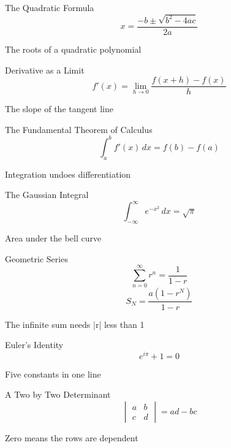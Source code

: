 \documentclass[aspectratio=169]{beamer}
\begin{document}
\begin{frame}{The Quadratic Formula}
\centering
\label{eq000}{\Huge \[ x = \frac{-b \pm \sqrt{b^2 - 4ac}}{2a} \]}
\vspace{0.6em}

{\small The roots of a quadratic polynomial}
\end{frame}
\begin{frame}{Derivative as a Limit}
\centering
\label{eq001}{\huge \[ f'(x) = \lim_{h \to 0} \frac{f(x+h) - f(x)}{h} \]}
\vspace{0.6em}

{\small The slope of the tangent line}
\end{frame}
\begin{frame}{The Fundamental Theorem of Calculus}
\centering
\label{eq002}{\Huge \[ \int_a^b f'(x)\,dx = f(b) - f(a) \]}
\vspace{0.6em}

{\small Integration undoes differentiation}
\end{frame}
\begin{frame}{The Gaussian Integral}
\centering
\label{eq003}{\Huge \[ \int_{-\infty}^{\infty} e^{-x^2}\,dx = \sqrt{\pi} \]}
\vspace{0.6em}

{\small Area under the bell curve}
\end{frame}
\begin{frame}{Geometric Series}
\centering
\label{eq004}{\Huge \[ \sum_{n=0}^{\infty} r^n = \frac{1}{1 - r} \]}
\vspace{0.4em}
\label{eq005}{\Large \[ S_N = \frac{a(1 - r^N)}{1 - r} \]}
\vspace{0.6em}

{\small The infinite sum needs |r| less than 1}
\end{frame}
\begin{frame}{Euler's Identity}
\centering
\label{eq006}{\Huge \[ e^{i\pi} + 1 = 0 \]}
\vspace{0.6em}

{\small Five constants in one line}
\end{frame}
\begin{frame}{A Two by Two Determinant}
\centering
\label{eq007}{\Huge \[ \begin{vmatrix} a & b \\ c & d \end{vmatrix} = ad - bc \]}
\vspace{0.6em}

{\small Zero means the rows are dependent}
\end{frame}
\end{document}
